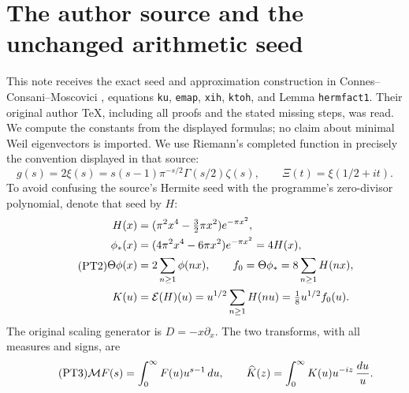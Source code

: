 \documentclass[11pt]{article}
\begin{document}
\section{The author source and the unchanged arithmetic seed}
This note receives the exact seed and approximation construction in
Connes--Consani--Moscovici \cite{swtheta:CCM}, equations \texttt{ku},
\texttt{emap}, \texttt{xih}, \texttt{ktoh}, and Lemma
\texttt{hermfact1}. Their original author TeX, including all proofs
and the stated missing steps, was read. We compute the constants from
the displayed formulas; no claim about minimal Weil eigenvectors is
imported. We use Riemann's completed function in precisely the
convention displayed in that source:
\begin{equation}\tag{PT1}
 g(s)=2\xi(s)=s(s-1)\pi^{-s/2}\Gamma(s/2)\zeta(s),\qquad
 \Xi(t)=\xi(1/2+it).
\end{equation}
To avoid confusing the source's Hermite seed with the programme's
zero-divisor polynomial, denote that seed by $H$:
\begin{equation}\tag{PT2}
 \begin{split}
 H(x)&=(\pi^2x^4-\tfrac32\pi x^2)e^{-\pi x^2},\\
 \phi_*(x)&=(4\pi^2x^4-6\pi x^2)e^{-\pi x^2}=4H(x),\\
 \Theta\phi(x)&=2\sum_{n\geq1}\phi(nx),\qquad
 f_0=\Theta\phi_*=8\sum_{n\geq1}H(nx),\\
 K(u)&=\mathcal E(H)(u)=u^{1/2}\sum_{n\geq1}H(nu)
                   =\tfrac18u^{1/2}f_0(u).
 \end{split}
\end{equation}
The original scaling generator is $D=-x\partial_x$.
The two transforms, with all measures and signs, are
\begin{equation}\tag{PT3}
 \mathcal M F(s)=\int_0^\infty F(u)u^{s-1}\,du,\qquad
 \widehat K(z)=\int_0^\infty K(u)u^{-iz}\,\frac{du}{u}.
\end{equation}
\end{document}
